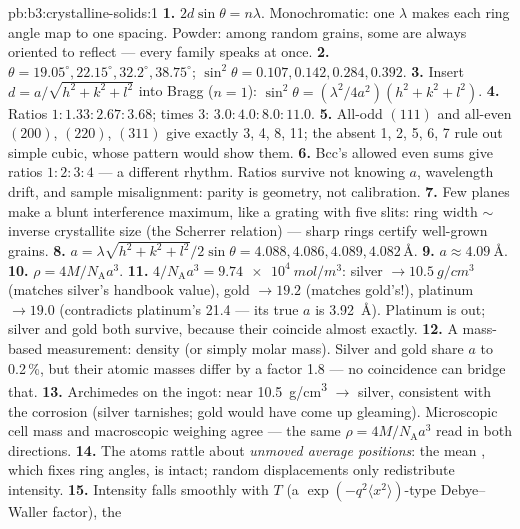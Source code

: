 \begin{solution}{pb:b3:crystalline-solids:1}
\textbf{1.} $2d\sin\theta = n\lambda$. Monochromatic: one
$\lambda$ makes each ring angle map to one spacing. Powder: among
random grains, some are always oriented to reflect --- every
family speaks at once.
\textbf{2.} $\theta = 19.05^\circ, 22.15^\circ, 32.2^\circ,
38.75^\circ$; $\sin^2\theta = 0.107, 0.142, 0.284, 0.392$.
\textbf{3.} Insert $d = a/\sqrt{h^2+k^2+l^2}$ into Bragg
($n = 1$): $\sin^2\theta = (\lambda^2/4a^2)(h^2+k^2+l^2)$.
\textbf{4.} Ratios $1 : 1.33 : 2.67 : 3.68$; times 3:
$3.0 : 4.0 : 8.0 : 11.0$.
\textbf{5.} All-odd $(111)$ and all-even $(200)$, $(220)$,
$(311)$ give exactly 3, 4, 8, 11; the absent 1, 2, 5, 6, 7 rule
out simple cubic, whose pattern would show them.
\textbf{6.} Bcc's allowed even sums give ratios
$1:2:3:4$ --- a different rhythm. Ratios survive not knowing
$a$, wavelength drift, and sample misalignment: parity is
geometry, not calibration.
\textbf{7.} Few planes make a blunt interference maximum, like a
grating with five slits: ring width $\sim$ inverse crystallite
size (the Scherrer relation) --- sharp rings certify well-grown
grains.
\textbf{8.} $a = \lambda\sqrt{h^2+k^2+l^2}/2\sin\theta = 4.088,
4.086, 4.089, 4.082\,\unit{\angstrom}$.
\textbf{9.} $a \approx \qty{4.09}{\angstrom}$.
\textbf{10.} $\rho = 4M/N_{\text{A}}a^3$.
\textbf{11.} $4/N_{\text{A}}a^3 = \qty{9.74e4}{mol/m^3}$:
silver $\to \qty{10.5}{g/cm^3}$ (matches silver's handbook
value), gold $\to 19.2$ (matches gold's!), platinum $\to 19.0$
(contradicts platinum's 21.4 --- its true $a$ is
\qty{3.92}{\angstrom}). Platinum is out; silver and gold both
survive, because their  coincide almost exactly.
\textbf{12.} A mass-based measurement: density (or simply molar
mass). Silver and gold share $a$ to 0.2\,\%, but their atomic
masses differ by a factor 1.8 --- no  coincidence can
bridge that.
\textbf{13.} Archimedes on the ingot: near \qty{10.5}{g/cm^3}
$\to$ silver, consistent with the corrosion (silver tarnishes;
gold would have come up gleaming). Microscopic cell mass and
macroscopic weighing agree --- the same
$\rho = 4M/N_{\text{A}}a^3$ read in both directions.
\textbf{14.} The atoms rattle about \emph{unmoved average
positions}: the mean , which fixes ring angles, is intact;
random displacements only redistribute intensity.
\textbf{15.} Intensity falls smoothly with $T$ (a
$\exp(-q^2\langle x^2\rangle)$-type Debye--Waller factor), the

\end{solution}
